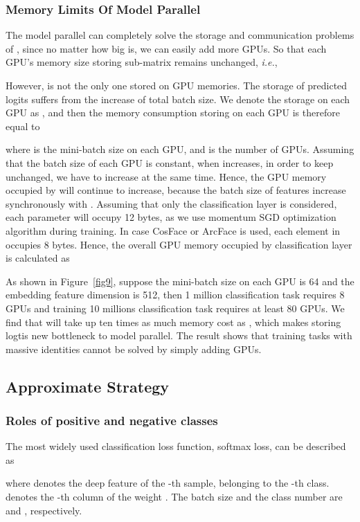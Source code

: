 \documentclass[letterpaper]{article} \usepackage{style/aaai21}  \usepackage{times}  \usepackage{helvet} \usepackage{courier}  \usepackage[hyphens]{url}  \usepackage{graphicx} \usepackage{color}
\begin{document}
\subsubsection{Memory Limits Of Model Parallel}
The model parallel can completely solve  the storage and communication problems of , since no matter how big  is, we can easily add more GPUs. So that each GPU's memory size storing sub-matrix  remains unchanged, \emph{i.e.},  

However,  is not the only one stored on GPU memories. The storage of predicted logits suffers from the increase of total batch size. We denote the  storage on each GPU as , and then the memory consumption storing  on each GPU is therefore equal to 
 
where  is the mini-batch size on each GPU, and  is the number of GPUs. Assuming that the batch size of each GPU is constant, when  increases, in order to keep  unchanged, we have to increase  at the same time. Hence, the GPU memory occupied by  will continue to increase, because the batch size of features increase synchronously with . 
Assuming that only the classification layer is considered, each parameter will occupy 12 bytes, as we use momentum SGD optimization algorithm during training. In case CosFace \cite{wang2018cosface} or ArcFace \cite{deng2019arcface} is used, each element in  occupies 8 bytes. Hence, the overall GPU memory occupied by classification layer is calculated as  

As shown in Figure~\ref{fig9}, suppose the mini-batch size on each GPU is 64 and the embedding feature dimension is 512, then 1 million classification task requires 8 GPUs and training 10 millions classification task requires at least 80 GPUs. We find that  will take up ten times as much memory cost as , which makes storing logtis new bottleneck to model parallel. The result shows that training tasks with massive identities cannot be solved by simply adding GPUs.


\subsection{Approximate Strategy}

\subsubsection{Roles of positive and negative classes}
The most widely used classification loss function, softmax loss, can be described as 


where  denotes the deep feature of the -th sample, belonging to the -th class.  denotes the -th column of the weight . The batch size and the class number are  and , respectively.
\end{document}
